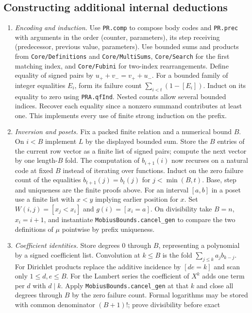 \subsection{Constructing additional internal deductions}
\begin{enumerate}
\item \emph{Encoding and induction.} Use \texttt{PR.comp} to compose
body codes and \texttt{PR.prec} with arguments in the order
(counter, parameters), its step receiving (predecessor, previous value,
parameters). Use bounded sums and products from \texttt{Core/Definitions}
and \texttt{Core/MultiSums}, \texttt{Core/Search} for the first matching
index, and \texttt{Core/Fubini} for two-index rearrangements. Define
equality of signed pairs by $u_++v_-=v_++u_-$. For a bounded family of
integer equalities $E_i$, form its failure count
$\sum_{i<t}(1-[E_i])$. Induct on its equality to zero using
\texttt{PRA.qfInd}. Nested counts allow several bounded indices.
Recover each equality since a nonzero summand contributes at least one.
This implements every use of finite strong induction on the prefix.
\item \emph{Inversion and posets.} Fix a packed finite relation and a
numerical bound $B$. On $i<B$ implement $L$ by the displayed bounded
sum. Store the $B$ entries of the current row vector as a finite list
of signed pairs; compute the next vector by one length-$B$ fold.
The computation of $b_{i+1}(i)$ now recurses on a natural code at fixed
$B$ instead of iterating over functions. Induct on the zero failure count
of the equalities $b_{t+1}(j)=b_t(j)$ for $j<\min(B,t)$.
Base, step and uniqueness are the finite proofs above. For an interval
$[a,b]$ in a poset use a finite list with $x<y$ implying earlier
position for $x$. Set $W(i,j)=[x_j<x_i]$ and $g(i)=[x_i=a]$.
On divisibility take $B=n$, $x_i=i+1$, and instantiate
\texttt{MobiusBounds.cancel\_gen} to compare the two definitions of
$\mu$ pointwise by prefix uniqueness.
\item \emph{Coefficient identities.} Store degrees $0$ through $B$,
representing a polynomial by a signed coefficient list. Convolution at
$k\le B$ is the fold $\sum_{j\le k}a_j b_{k-j}$. For Dirichlet
products replace the additive incidence by $[de=k]$ and scan only
$1\le d,e\le B$. For the Lambert series the coefficient of $X^k$
adds one term per $d$ with $d\mid k$. Apply
\texttt{MobiusBounds.cancel\_gen} at that $k$ and close all degrees
through $B$ by the zero failure count. Formal logarithms may be stored
with common denominator $(B+1)!$; prove divisibility before exact

\end{enumerate}
